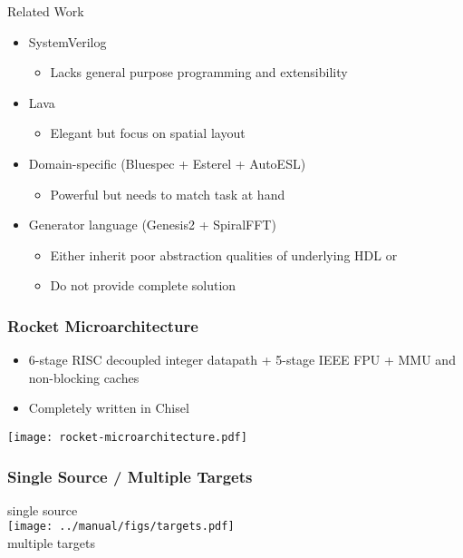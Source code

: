 \documentclass[xcolor=pdflatex,dvipsnames,table]{beamer}
\begin{document}
\begin{frame}{Related Work}

\begin{itemize}
\item SystemVerilog
\begin{itemize}
\item Lacks general purpose programming and extensibility
\end{itemize}
\item Lava
\begin{itemize}
\item Elegant but focus on spatial layout
\end{itemize}
\item Domain-specific (Bluespec + Esterel + AutoESL)
\begin{itemize}
\item Powerful but needs to match task at hand	
\end{itemize}
\item Generator language (Genesis2 + SpiralFFT)
\begin{itemize}
\item Either inherit poor abstraction qualities of underlying HDL or
\item Do not provide complete solution
\end{itemize}
\end{itemize}

\end{frame}

\begin{frame}[fragile]
\frametitle{Rocket Microarchitecture}
\begin{itemize}
\item 6-stage RISC decoupled integer datapath + 5-stage IEEE FPU + MMU
  and non-blocking caches
\item Completely written in Chisel
\end{itemize}
\texttt{[image: rocket-microarchitecture.pdf]}

\end{frame}

\ifx\poster\undefined
\begin{frame}[fragile]
\frametitle{Single Source / Multiple Targets}

\begin{center}
single source \\
\texttt{[image: ../manual/figs/targets.pdf]} \\
multiple targets \
\end{center}

\end{frame}
\fi
\end{document}

